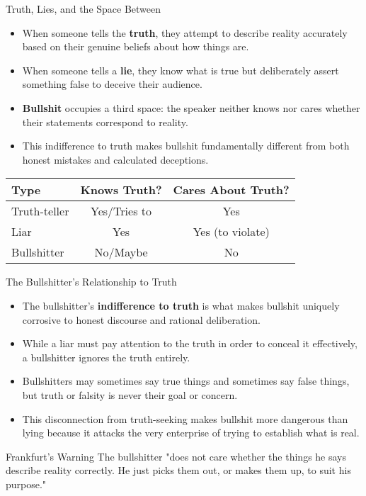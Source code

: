 \documentclass{beamer}
\begin{document}
	\begin{frame}{Truth, Lies, and the Space Between}
		\begin{itemize}
			\item When someone tells the \textbf{truth}, they attempt to describe reality accurately based on their genuine beliefs about how things are.
			\item When someone tells a \textbf{lie}, they know what is true but deliberately assert something false to deceive their audience.
			\item \textbf{Bullshit} occupies a third space: the speaker neither knows nor cares whether their statements correspond to reality.
			\item This indifference to truth makes bullshit fundamentally different from both honest mistakes and calculated deceptions.
		\end{itemize}
		
		\begin{table}
			\begin{tabular}{lcc}
				\toprule
				\textbf{Type} & \textbf{Knows Truth?} & \textbf{Cares About Truth?} \\
				\midrule
				Truth-teller & Yes/Tries to & Yes \\
				Liar & Yes & Yes (to violate) \\
				Bullshitter & No/Maybe & No \\
				\bottomrule
			\end{tabular}
		\end{table}
	\end{frame}
	
	\begin{frame}{The Bullshitter's Relationship to Truth}
		\begin{itemize}
			\item The bullshitter's \textbf{indifference to truth} is what makes bullshit uniquely corrosive to honest discourse and rational deliberation.
			\item While a liar must pay attention to the truth in order to conceal it effectively, a bullshitter ignores the truth entirely.
			\item Bullshitters may sometimes say true things and sometimes say false things, but truth or falsity is never their goal or concern.
			\item This disconnection from truth-seeking makes bullshit more dangerous than lying because it attacks the very enterprise of trying to establish what is real.
		\end{itemize}
		
		\begin{alertblock}{Frankfurt's Warning}
			The bullshitter "does not care whether the things he says describe reality correctly. He just picks them out, or makes them up, to suit his purpose."
		\end{alertblock}
	\end{frame}
	
\end{document}
